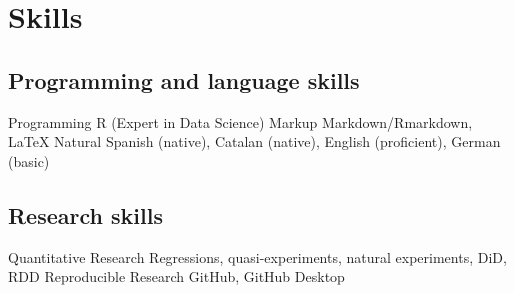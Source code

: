 \documentclass[11pt,a4paper,]{awesome-cv}
\begin{document}
\hypertarget{skills}{%
\section{Skills}\label{skills}}

\hypertarget{programming-and-language-skills}{%
\subsection{Programming and language
skills}\label{programming-and-language-skills}}

\begin{cvskills}
  \cvskill
    {Programming}
    {R (Expert in Data Science)}
  \cvskill
    {Markup}
    {Markdown/Rmarkdown, LaTeX}
  \cvskill
    {Natural}
    {Spanish (native), Catalan (native), English (proficient), German (basic)}
\end{cvskills}

\hypertarget{research-skills}{%
\subsection{Research skills}\label{research-skills}}

\begin{cvskills}
  \cvskill
    {Quantitative Research}
    {Regressions, quasi-experiments, natural experiments, DiD, RDD}
  \cvskill
    {Reproducible Research}
    {GitHub, GitHub Desktop}
\end{cvskills}
\end{document}

